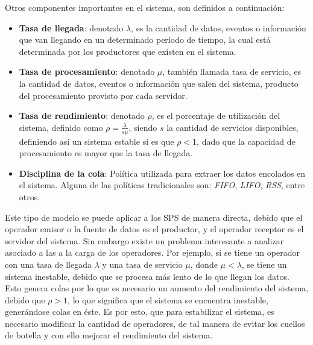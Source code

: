 Otros componentes importantes en el sistema, son definidos a continuación:
\begin{itemize}
	\item \textbf{Tasa de llegada}: denotado $\lambda$, es la cantidad de datos, eventos o información que van llegando en un determinado período de tiempo, la cual está determinada por los productores que existen en el sistema.
	\item \textbf{Tasa de procesamiento}: denotado $\mu$, también llamada tasa de servicio, es la cantidad de datos, eventos o información que salen del sistema, producto del procesamiento provisto por cada servidor.
	\item \textbf{Tasa de rendimiento}: denotado $\rho$, es el porcentaje de utilización del sistema, definido como $\rho = \frac{\lambda}{s\mu}$, siendo $s$ la cantidad de servicios disponibles, definiendo así un sistema estable si es que $\rho < 1$, dado que la capacidad de procesamiento es mayor que la tasa de llegada.
	\item \textbf{Disciplina de la cola}: Política utilizada para extraer los datos encolados en el sistema. Alguna de las políticas tradicionales son: \textit{FIFO}, \textit{LIFO}, \textit{RSS}, entre otros.
\end{itemize}

Este tipo de modelo se puede aplicar a los SPS de manera directa, debido que el operador emisor o la fuente de datos es el productor, y el operador receptor es el servidor del sistema. Sin embargo existe un problema interesante a analizar asociado a las a la carga de los operadores. Por ejemplo, si se tiene un operador con una tasa de llegada $\lambda$ y una tasa de servicio $\mu$, donde $\mu < \lambda$, se tiene un sistema inestable, debido que se procesa más lento de lo que llegan los datos. Esto genera colas por lo que es necesario un aumento del rendimiento del sistema, debido que $\rho > 1 $, lo que significa que el sistema se encuentra inestable, generándose colas en éste. Es por esto, que para estabilizar el sistema, es necesario modificar la cantidad de operadores, de tal manera de evitar los cuellos de botella y con ello mejorar el rendimiento del sistema.